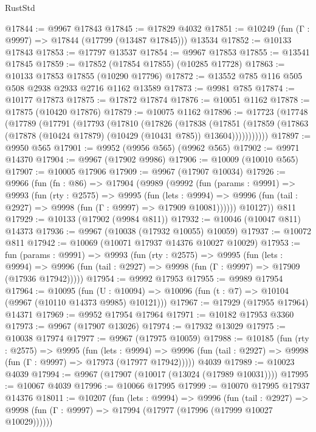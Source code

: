 \begin{lexlean}{RustStd}
\begin{coremodule}
{\begin{coremodule}
{{{{{{{{{{{{{{{{{{{{{{{{{{{{{{{{{{{{{{{{{{{{{{{{{{{{{{{{{{{{{{{{{{{{{{{{{{{{{{@17844 := @9967 @17843
@17845 := @17829 @4032
@17851 := @10249 (fun (Γ : @9997) => @17844 (@17799 (@13487 @17845))) @13534
@17852 := @10133 @17843
@17853 := @17797 @13537
@17854 := @9967 @17853
@17855 := @13541 @17845
@17859 := @17852 (@17854 @17855) (@10285 @17728)
@17863 := @10133 @17853 @17855 (@10290 @17796)
@17872 := @13552 @785 @116 @505 @508 @2938 @2933 @2716 @1162 @13589
@17873 := @9981 @785
@17874 := @10177 @17873
@17875 := @17872 @17874
@17876 := @10051 @1162
@17878 := @17875 (@10420 @17876)
@17879 := @10075 @1162
@17896 := @17723
    (@17748
      (@17789
        (@17791
          (@17793
            (@17810
              (@17826
                (@17838
                  (@17851
                    (@17859 (@17863 (@17878 (@10424 @17879) (@10429 (@10431 @785)) @13604)))))))))))
@17897 := @9950 @565
@17901 := @9952 (@9956 @565) (@9962 @565)
@17902 := @9971 @14370
@17904 := @9967 (@17902 @9986)
@17906 := @10009 (@10010 @565)
@17907 := @10005 @17906
@17909 := @9967 (@17907 @10034)
@17926 := @9966
    (fun (fn : @86) =>
    @17904
      (@9989
        (@9992
          (fun (params : @9991) =>
          @9993
            (fun (rty : @2575) =>
            @9995
              (fun (lets : @9994) =>
              @9996 (fun (tail : @2927) => @9998 (fun (Γ : @9997) => @17909 @10081))))))
        @10127))
    @811
@17929 := @10133 (@17902 (@9984 @811))
@17932 := @10046 (@10047 @811) @14373
@17936 := @9967 (@10038 (@17932 @10055) @10059)
@17937 := @10072 @811
@17942 := @10069 (@10071 @17937 @14376 @10027 @10029)
@17953 := fun (params : @9991) =>
  @9993
    (fun (rty : @2575) =>
    @9995
      (fun (lets : @9994) =>
      @9996 (fun (tail : @2927) => @9998 (fun (Γ : @9997) => @17909 (@17936 @17942)))))
@17954 := @9992 @17953
@17955 := @9989 @17954
@17964 := @10095
    (fun (U : @10094) => @10096 (fun (t : @7) => @10104 (@9967 (@10110 @14373 @9985) @10121)))
@17967 := @17929 (@17955 @17964) @14371
@17969 := @9952 @17954 @17964
@17971 := @10182 @17953 @3360
@17973 := @9967 (@17907 @13026)
@17974 := @17932 @13029
@17975 := @10038 @17974
@17977 := @9967 (@17975 @10059)
@17988 := @10185
    (fun (rty : @2575) =>
    @9995
      (fun (lets : @9994) =>
      @9996 (fun (tail : @2927) => @9998 (fun (Γ : @9997) => @17973 (@17977 @17942)))))
    @4039
@17989 := @10023 @4039
@17994 := @9967 (@17907 (@10017 (@13024 (@17989 @10031))))
@17995 := @10067 @4039
@17996 := @10066 @17995
@17999 := @10070 @17995 @17937 @14376
@18011 := @10207
    (fun (lets : @9994) =>
    @9996
      (fun (tail : @2927) =>
      @9998 (fun (Γ : @9997) => @17994 (@17977 (@17996 (@17999 @10027 @10029))))))
}}}}}}}}}}}}}}}}}}}}}}}}}}}}}}}}}}}}}}}}}}}}}}}}}}}}}}}}}}}}}}}}}}}}}}}}}}}}}}
\end{coremodule}}
\end{coremodule}
\end{lexlean}
